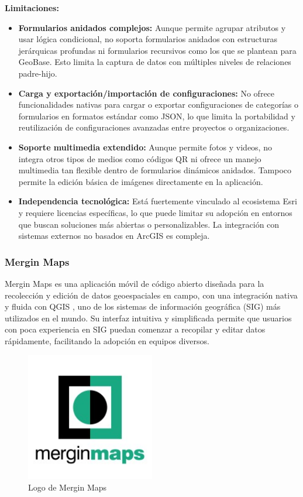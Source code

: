 \documentclass{article}
\begin{document}
\textbf{Limitaciones:}
\begin{itemize}
  \item \textbf{Formularios anidados complejos:} Aunque permite agrupar atributos y usar lógica condicional, no soporta formularios anidados con estructuras jerárquicas profundas ni formularios recursivos como los que se plantean para GeoBase. Esto limita la captura de datos con múltiples niveles de relaciones padre-hijo.
  
  \item \textbf{Carga y exportación/importación de configuraciones:} No ofrece funcionalidades nativas para cargar o exportar configuraciones de categorías o formularios en formatos estándar como JSON, lo que limita la portabilidad y reutilización de configuraciones avanzadas entre proyectos o organizaciones.
  
  \item \textbf{Soporte multimedia extendido:} Aunque permite fotos y videos, no integra otros tipos de medios como códigos QR ni ofrece un manejo multimedia tan flexible dentro de formularios dinámicos anidados. Tampoco permite la edición básica de imágenes directamente en la aplicación.
  
  \item \textbf{Independencia tecnológica:} Está fuertemente vinculado al ecosistema Esri y requiere licencias específicas, lo que puede limitar su adopción en entornos que buscan soluciones más abiertas o personalizables. La integración con sistemas externos no basados en ArcGIS es compleja.
\end{itemize}

\subsubsection{Mergin Maps}

Mergin Maps \cite{merginmapsdocs} es una aplicación móvil de código abierto diseñada para la recolección y edición de datos geoespaciales en campo, con una integración nativa y fluida con QGIS \cite{qgisdocs}, uno de los sistemas de información geográfica (SIG) más utilizados en el mundo. Su interfaz intuitiva y simplificada permite que usuarios con poca experiencia en SIG puedan comenzar a recopilar y editar datos rápidamente, facilitando la adopción en equipos diversos.

\begin{figure}[h]
  \centering
  \includegraphics[width=0.5\textwidth]{images/mergin_maps.jpeg}
  \caption{Logo de Mergin Maps}
  \label{fig:merginlogo}
\end{figure}
\end{document}
